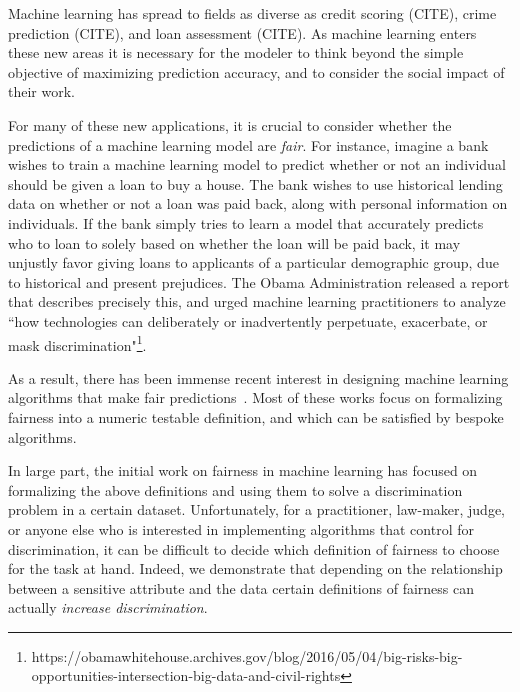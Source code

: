 Machine learning has spread to fields as diverse as credit scoring
(CITE), crime prediction (CITE), and loan assessment (CITE). As
machine learning enters these new areas it is necessary for the
modeler to think beyond the simple objective of maximizing prediction
accuracy, and to consider the social impact of their work.

For many of these new applications, it is crucial to
consider whether the predictions of a machine learning model are
\emph{fair}. For instance, imagine a bank wishes to train a machine
learning model to predict whether or not an individual should be given
a loan to buy a house. The bank wishes to use historical lending data
on whether or not a loan was paid back, along with personal
information on individuals. If the bank simply tries to learn a model
that accurately predicts who to loan to solely based on whether the
loan will be paid back, it may unjustly favor giving loans to
applicants of a particular demographic group, due to historical and
present prejudices. The Obama Administration released a report that
describes precisely this, and urged machine learning practitioners to
analyze ``how technologies can deliberately or inadvertently
perpetuate, exacerbate, or mask
discrimination"\footnote{https://obamawhitehouse.archives.gov/blog/2016/05/04/big-risks-big-opportunities-intersection-big-data-and-civil-rights}.

As a result, there has been immense recent interest in designing
machine learning algorithms that make fair
predictions~\cite{hardt2016equality,dwork2012fairness,joseph2016rawlsian,kamishima2011fairness,zliobaite2015survey,zafar2016fairness,zafar2015learning,grgiccase,kleinberg2016inherent,calders2010three,kamiran2012data,bolukbasi2016man,kamiran2009classifying,zemel2013learning,louizos2015variational}. Most
of these works focus on formalizing fairness into a numeric testable
definition, and which can be satisfied by bespoke algorithms.

In large part, the initial work on fairness in machine learning has
focused on formalizing the above definitions and using them to solve a
discrimination problem in a certain dataset. Unfortunately, for a
practitioner, law-maker, judge, or anyone else who is interested in
implementing algorithms that control for discrimination, it can be
difficult to decide which definition of fairness to choose for the
task at hand. Indeed, we demonstrate that depending on the
relationship between a sensitive attribute and the data certain
definitions of fairness can actually \emph{increase discrimination}.

